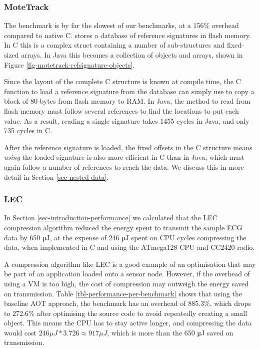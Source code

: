 \subsubsection{MoteTrack}
The  benchmark is by far the slowest of our benchmarks, at a 156\% overhead compared to native C.  stores a database of reference signatures in flash memory. In C this is a complex struct containing a number of sub-structures and fixed-sized arrays. In Java this becomes a collection of objects and arrays, shown in Figure \ref{fig-motetrack-refsignature-objects}.

Since the layout of the complete C structure is known at compile time, the C function to load a reference signature from the database can simply use  to copy a block of 80 bytes from flash memory to RAM. In Java, the method to read from flash memory must follow several references to find the locations to put each value. As a result, reading a single signature takes 1455 cycles in Java, and only 735 cycles in C.

After the reference signature is loaded, the fixed offsets in the C structure means \emph{using} the loaded signature is also more efficient in C than in Java, which must again follow a number of references to reach the data. We discuss this in more detail in Section \ref{sec-nested-data}.

\subsubsection{LEC}
In Section \ref{sec-introduction-performance} we calculated that the LEC compression algorithm reduced the energy spent to transmit the sample ECG data by 650 μJ, at the expense of 246 μJ spent on CPU cycles compressing the data, when implemented in C and using the ATmega128 CPU and CC2420 radio.

A compression algorithm like LEC is a good example of an optimisation that may be part of an application loaded onto a sensor node. However, if the overhead of using a VM is too high, the cost of compression may outweigh the energy saved on transmission. Table \ref{tbl-performance-per-benchmark} shows that using the baseline AOT approach, the  benchmark has an overhead of 885.3\%, which drops to 272.6\% after optimising the source code to avoid repeatedly creating a small object. This means the CPU has to stay active longer, and compressing the data would cost $246 \mu J * 3.726 \approx 917 \mu J$, which is more than the 650 μJ saved on transmission.

